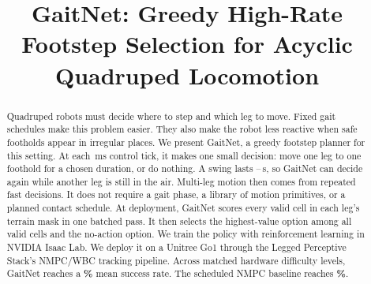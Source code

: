 \documentclass[conference]{IEEEtran}
\newif\ifrevmarkup
\newcommand{\changed}[1]{\ifrevmarkup\textcolor{red}{#1}\else#1\fi}
\newcommand{\pending}[1]{\ifrevmarkup\textcolor{orange}{#1}\else#1\fi}
\begin{document}
\title{GaitNet: Greedy High-Rate Footstep Selection for Acyclic
  Quadruped Locomotion}

\author{
  \and
  \and
}

\maketitle

\begin{abstract}
  Quadruped robots must decide where to step and which leg to move.
  Fixed gait schedules make this problem easier. They also make the
  robot less reactive when safe footholds appear in irregular places.
  We present GaitNet, a greedy footstep planner for this setting. At
  each \corlControlTickMs\,ms control tick, it makes one small
  decision: move one leg to one foothold for a chosen duration, or do
  nothing. A swing lasts
  \corlSwingDurationMin--\corlSwingDurationMax\,s, so GaitNet can
  decide again while another leg is still in the air. Multi-leg
  motion then comes from repeated fast decisions. It does not require
  a gait phase, a library of motion primitives, or a planned contact
  schedule. \changed{At deployment, GaitNet scores every valid cell in
  each leg's terrain mask in one batched pass. It then selects the
  highest-value option among all valid cells and the no-action
  option.} We train the policy with reinforcement learning in NVIDIA
  Isaac Lab. We deploy it on a Unitree Go1 through the Legged
  Perceptive Stack's NMPC/WBC tracking pipeline. \pending{Across
  matched hardware difficulty levels, GaitNet reaches a
  \textbf{\corlHwFullSuccess\%} mean success rate. The scheduled NMPC
  baseline reaches \textbf{\corlHwLPSSuccess\%}.}
\end{abstract}
\end{document}
